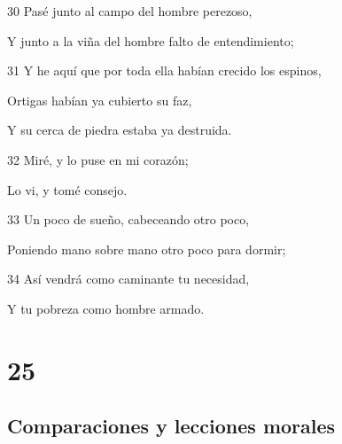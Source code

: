 \par 30 Pasé junto al campo del hombre perezoso,
\par Y junto a la viña del hombre falto de entendimiento;
\par 31 Y he aquí que por toda ella habían crecido los espinos,
\par Ortigas habían ya cubierto su faz,
\par Y su cerca de piedra estaba ya destruida.
\par 32 Miré, y lo puse en mi corazón;
\par Lo vi, y tomé consejo.
\par 33 Un poco de sueño, cabeceando otro poco,
\par Poniendo mano sobre mano otro poco para dormir;
\par 34 Así vendrá como caminante tu necesidad,
\par Y tu pobreza como hombre armado. 

\chapter{25}

\section*{Comparaciones y lecciones morales}

